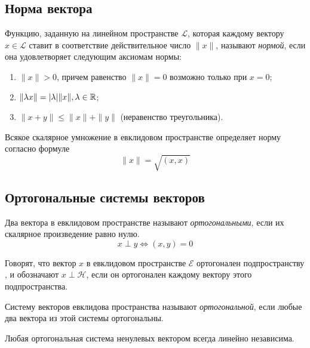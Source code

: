 \subsection{Норма вектора}

\begin{definition}
  Функцию, заданную на линейном пространстве $\mathcal{L}$, которая каждому вектору $x \in \mathcal{L}$ ставит в соответствие действительное число $\|x\|$, называют \textit{нормой}, если она удовлетворяет следующим аксиомам нормы:
  \begin{enumerate}
    \item $\|x\| > 0$, причем равенство $\|x\| = 0$ возможно только при $x = 0$;
    \item $\|\lambda x\| = |\lambda| \|x\|, \lambda \in \mathbb{R}$;
    \item $\|x + y\| \le \|x\| + \|y\|$ (неравенство треугольника).
  \end{enumerate}
\end{definition}

\begin{theorem}
  Всякое скалярное умножение в евклидовом пространстве определяет норму согласно формуле \[
  \|x\| = \sqrt{\left( x, x \right) } 
  \] 
\end{theorem}

\subsection{Ортогональные системы векторов}

\begin{definition}
  Два вектора в евклидовом пространстве называют \textit{ортогональными}, если их скалярное произведение равно нулю. \[
  x \perp y \iff (x, y) = 0
  \] 
\end{definition}

Говорят, что вектор $x$ в евклидовом пространстве $\mathcal{E}$ ортогонален подпространству , и обозначают $x \perp \mathcal{H}$, если он ортогонален каждому вектору этого подпространства.

\begin{definition}
  Систему векторов евклидова пространства называют \textit{ортогональной}, если любые два вектора из этой системы ортогональны.
\end{definition}

\begin{theorem}
  Любая ортогональная система ненулевых вектором всегда линейно независима.
\end{theorem}


